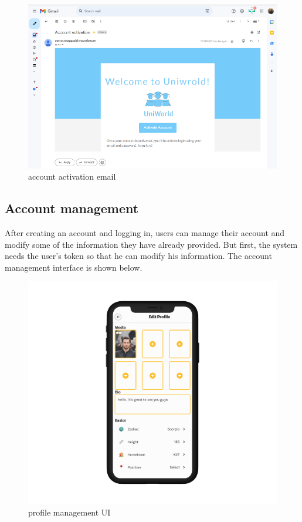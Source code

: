 \begin{figure}[H] 
            \centering
            \includegraphics[scale=0.5]{account actiavation mail.png}
            \caption{account activation email} 
            \label{fig: account activation email}
\end{figure}
\subsection{Account management}
After creating an account and logging in, users can manage their account and modify some of the information they have already provided. But first, the system needs the user's token so that he can modify his information.
The account management interface is shown below. 
\begin{figure}[H] 
            \centering
            \includegraphics[scale=0.2]{profile managment UI.png}
            \caption{profile management UI} 
            \label{fig: profile management UI}
\end{figure}

